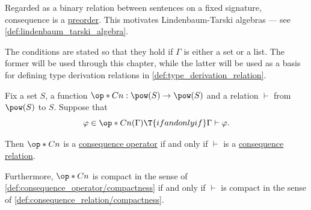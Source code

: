 \begin{comments}
  \item Regarded as a binary relation between sentences on a fixed signature, consequence is a \hyperref[def:preordered_set]{preorder}. This motivates Lindenbaum-Tarski algebras --- see \cref{def:lindenbaum_tarski_algebra}.

  \item The conditions are stated so that they hold if \( \Gamma \) is either a set or a list. The former will be used through this chapter, while the latter will be used as a basis for defining type derivation relations in \cref{def:type_derivation_relation}.
\end{comments}

\begin{proposition}\label{thm:consequence_operators_and_relations}
  Fix a set \( S \), a function \( \op*{Cn}: \pow(S) \to \pow(S) \) and a relation \( \vdash \) from \( \pow(S) \) to \( S \). Suppose that
  \begin{equation}\label{eq:thm:consequence_operators_and_relations}
    \varphi \in \op*{Cn}(\Gamma) \T{if and only if} \Gamma \vdash \varphi.
  \end{equation}

  Then \( \op*{Cn} \) is a \hyperref[def:consequence_operator]{consequence operator} if and only if \( {\vdash} \) is a \hyperref[def:consequence_relation]{consequence relation}.

  Furthermore, \( \op*{Cn} \) is compact in the sense of \cref{def:consequence_operator/compactness} if and only if \( \vdash \) is compact in the sense of \cref{def:consequence_relation/compactness}.
\end{proposition}
